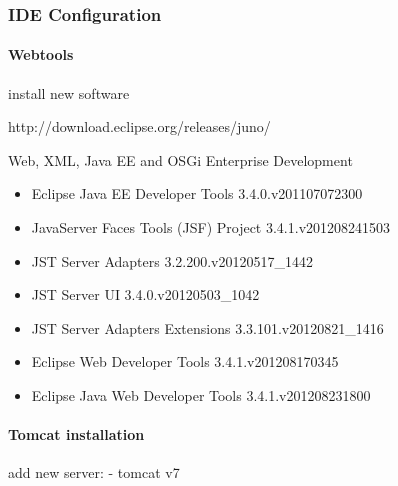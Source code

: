 \subsubsection{IDE Configuration}

\paragraph{Webtools}
install new software

http://download.eclipse.org/releases/juno/ 

Web, XML, Java EE and OSGi Enterprise Development	
\begin{itemize}
	\item Eclipse Java EE Developer Tools	3.4.0.v201107072300
	\item JavaServer Faces Tools (JSF) Project	3.4.1.v201208241503
	\item JST Server Adapters	3.2.200.v20120517\_1442
	\item JST Server UI	3.4.0.v20120503\_1042
	\item JST Server Adapters Extensions	3.3.101.v20120821\_1416
	\item Eclipse Web Developer Tools	3.4.1.v201208170345
	\item Eclipse Java Web Developer Tools	3.4.1.v201208231800
\end{itemize} 
\paragraph{Tomcat installation}

add new server:
- tomcat v7

